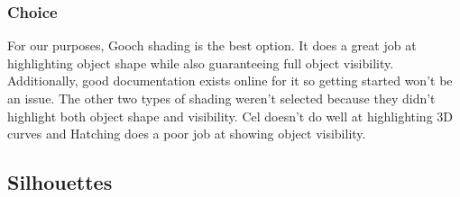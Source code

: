 \documentclass[10pt,journal,compsoc,draftclsnofoot]{IEEEtran}
\begin{document}
\subsubsection{Choice}
For our purposes, Gooch shading is the best option. 
It does a great job at highlighting object shape while also guaranteeing full object visibility. 
Additionally, good documentation exists online for it so getting started won't be an issue.
The other two types of shading weren't selected because they didn't highlight both object shape and visibility.
Cel doesn't do well at highlighting 3D curves and Hatching does a poor job at showing object visibility.

\newpage

\subsection{Silhouettes}
\end{document}
